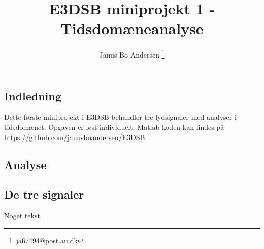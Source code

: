 \documentclass[a4paper]{report}
\author{Janus Bo Andersen \thanks{ja67494@post.au.dk}}
\begin{document}



    
    
    \title{E3DSB miniprojekt 1 - Tidsdomæneanalyse}
        

    \maketitle

\tableofcontents
\newpage


    \begin{par}

\chapter{Indledning}
Dette første miniprojekt i E3DSB behandler tre lydsignaler med analyser i tidsdomænet.
Opgaven er løst individuelt.
Matlab-koden kan findes på \url{https://github.com/janusboandersen/E3DSB}.

\end{par} \vspace{1em}
\begin{par}

\chapter{Analyse}

\end{par} \vspace{1em}



\section{De tre signaler}

\begin{par}
Noget tekst
\end{par} \vspace{1em}
\end{document}
